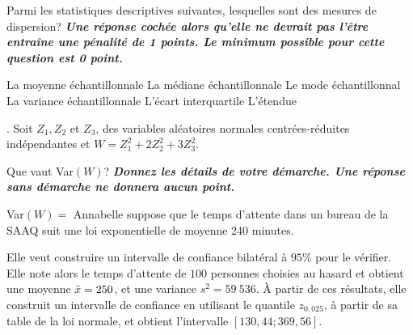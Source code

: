 \begin{questions}
\question[4]
Parmi les statistiques descriptives suivantes, lesquelles sont des mesures de dispersion? \textit{\textbf{Une réponse cochée alors qu'elle ne devrait pas l'être entraîne une pénalité de 1 points. Le minimum possible pour cette question est 0 point.}}

\begin{checkboxes}
\correctchoice La moyenne échantillonnale
\choice La médiane échantillonnale
\choice Le mode échantillonnal
\correctchoice La variance échantillonnale
\choice L'écart interquartile
\choice L'étendue
\end{checkboxes}
\newpage
.
\newpage
\question[4]
Soit $Z_1,Z_2$ et $Z_{3}$, des variables aléatoires normales centrées-réduites indépendantes et $\displaystyle W=Z_1^2+2Z_2^2+3Z_3^2$. 

Que vaut Var$(W)$? \textbf{\textit{Donnez les détails de votre démarche. Une réponse sans démarche ne donnera aucun point.}}

\begin{solution}

\end{solution}

\vspace{9cm}
Var$(W)=$ 
\question 
Annabelle suppose que le temps d'attente dans un bureau de la SAAQ suit une loi exponentielle de moyenne 240 minutes.

Elle veut construire un intervalle de confiance bilatéral à $95\%$ pour le vérifier. 
Elle note alors le temps d'attente de $100$ personnes choisies au hasard et obtient une moyenne $\Bar{x}=250$, et une variance $s^2=59~536$. 
À partir de ces résultats, elle construit un intervalle de confiance en utilisant le quantile $z_{0,025}$, à partir de sa table de la loi normale, et obtient l'intervalle $[130,44;369,56]$. 
\end{questions}
